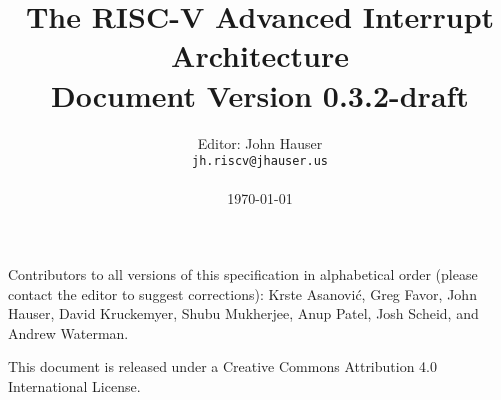 \documentclass[twoside,11pt]{book}
\newcommand{\AIARev}{0.3.2-draft}
\begin{document}

\title{%
  \vspace{-0.7in}%
  {\Large\bf The RISC-V Advanced Interrupt Architecture} \\
  {\large Document Version \AIARev}
  \vspace{-0.1in}%
}

\author{%
  Editor: John Hauser \\
  {\tt jh.riscv\mbox{}@jhauser.us} \\
  \\
  \today
}

\date{}
\maketitle

\thispagestyle{empty}

Contributors to all versions of this specification in alphabetical
order (please contact the editor to suggest corrections):
Krste Asanovi\'{c},
Greg Favor,
John Hauser,
David Kruckemyer,
Shubu Mukherjee,
Anup Patel,
Josh Scheid,
and Andrew Waterman.

This document is released under a Creative Commons Attribution 4.0
International License.


\frontmatter



{\hypersetup{linktoc=all,hidelinks}
\tableofcontents
}


\mainmatter











\end{document}
